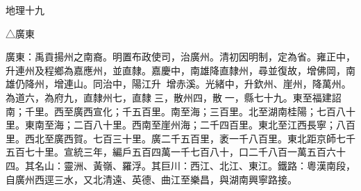 
\begin{pinyinscope}
地理十九

△廣東

廣東：禹貢揚州之南裔。明置布政使司，治廣州。清初因明制，定為省。雍正中，升連州及程鄉為嘉應州，並直隸。嘉慶中，南雄降直隸州，尋並復故，增佛岡，南雄仍降州，增連山。同治中，陽江升，增赤溪。光緒中，升欽州、崖州，降萬州。為道六，為府九，直隸州七，直隸三，散州四，散一，縣七十九。東至福建詔南；千里。西至廣西宣化；千五百里。南至海；三百里。北至湖南桂陽；七百八十里。東南至海；二百八十里。西南至崖州海；二千四百里。東北至江西長寧；八百里。西北至廣西賀。七百三十里。廣二千五百里，袤一千八百里。東北距京師七千五百七十里。宣統三年，編戶五百四萬一千七百八十，口二千八百一萬五百六十四。其名山：靈洲、黃嶺、羅浮。其巨川：西江、北江、東江。鐵路：粵漢南段，自廣州西逕三水，又北清遠、英德、曲江至樂昌，與湖南興寧路接。


\end{pinyinscope}
